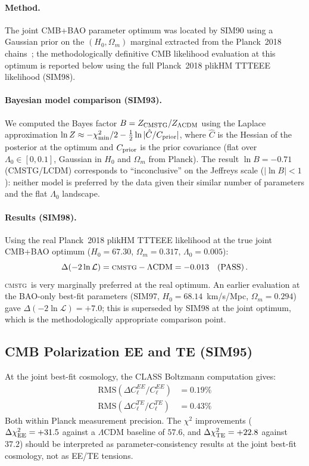 \documentclass[12pt,a4paper]{article}
\newcommand{\CMSTG}{\textsc{cmstg}}
\newcommand{\Lz}{\Lambda_0}
\begin{document}
\paragraph{Method.} The joint CMB+BAO parameter optimum was located by SIM90
using a Gaussian prior on the $(H_0, \Omega_m)$ marginal extracted from the
Planck~2018 chains~\cite{Planck2018}; the methodologically definitive CMB
likelihood evaluation at this optimum is reported below using the full
Planck~2018 plikHM TTTEEE likelihood (SIM98).

\paragraph{Bayesian model comparison (SIM93).} We computed the Bayes factor
$B = Z_{\rm CMSTG}/Z_{\Lambda\rm CDM}$ using the Laplace approximation
$\ln Z \approx -\chi^2_{\rm min}/2 - \frac{1}{2}\ln|\hat{C}/C_{\rm prior}|$,
where $\hat{C}$ is the Hessian of the posterior at the optimum and $C_{\rm prior}$
is the prior covariance (flat over $\Lz \in [0, 0.1]$, Gaussian in $H_0$ and
$\Omega_m$ from Planck). The result $\ln B = -0.71$ (CMSTG/LCDM) corresponds
to ``inconclusive'' on the Jeffreys scale ($|\ln B| < 1$): neither model is
preferred by the data given their similar number of parameters and the
flat $\Lz$ landscape.

\paragraph{Results (SIM98).} Using the real Planck~2018 plikHM TTTEEE likelihood
at the true joint CMB+BAO optimum ($H_0 = 67.30$, $\Omega_m = 0.317$, $\Lz =
0.005$):
\begin{equation}
  \Delta(-2\ln\mathcal{L}) = \CMSTG - \Lambda\mathrm{CDM} = -0.013 \quad\text{(PASS)}\,.
\end{equation}
\CMSTG\ is very marginally preferred at the real optimum.
An earlier evaluation at the BAO-only best-fit parameters (SIM97,
$H_0 = 68.14$~km/s/Mpc, $\Omega_m = 0.294$) gave
$\Delta(-2\ln\mathcal{L}) = +7.0$; this is superseded by SIM98 at the
joint optimum, which is the methodologically appropriate comparison point.

\subsection{CMB Polarization EE and TE (SIM95)}
\label{sec:polarization}

At the joint best-fit cosmology, the CLASS Boltzmann computation gives:
\begin{align}
  \mathrm{RMS}(\Delta C_\ell^{EE}/C_\ell^{EE}) &= 0.19\% \nonumber \\
  \mathrm{RMS}(\Delta C_\ell^{TE}/C_\ell^{TE}) &= 0.43\% \nonumber
\end{align}
Both within Planck measurement precision. The $\chi^2$ improvements ($\Delta\chi^2_{\rm EE} =
+31.5$ against a $\Lambda$CDM baseline of $57.6$, and $\Delta\chi^2_{\rm TE} = +22.8$
against $37.2$) should be interpreted as parameter-consistency results at
the joint best-fit cosmology, not as EE/TE tensions.
\end{document}
